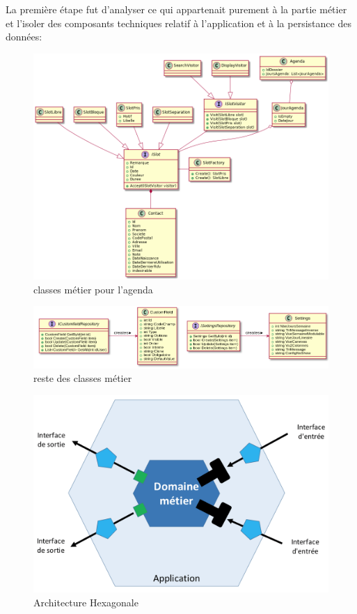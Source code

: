 La première étape fut d'analyser ce qui appartenait purement à la partie métier et l'isoler des composants 
techniques relatif à l'application et à la persistance des données: \newline

\begin{figure}[h]
	\centering
	\includegraphics[width=1\linewidth]{Images/slotmodelold}
	\caption{classes métier pour l'agenda}
	\label{fig:domainagenda}
\end{figure}

\begin{figure}[h]
	\centering
	\includegraphics[width=1\linewidth]{Images/otherpersistence}
	\caption{reste des classes métier}
	\label{fig:otherrepo}
\end{figure}

\begin{figure}[h]
	\centering
	\includegraphics[width=0.8\linewidth]{Images/hexarch}
	\caption{Architecture Hexagonale}
	\label{fig:archhexa}
\end{figure}


